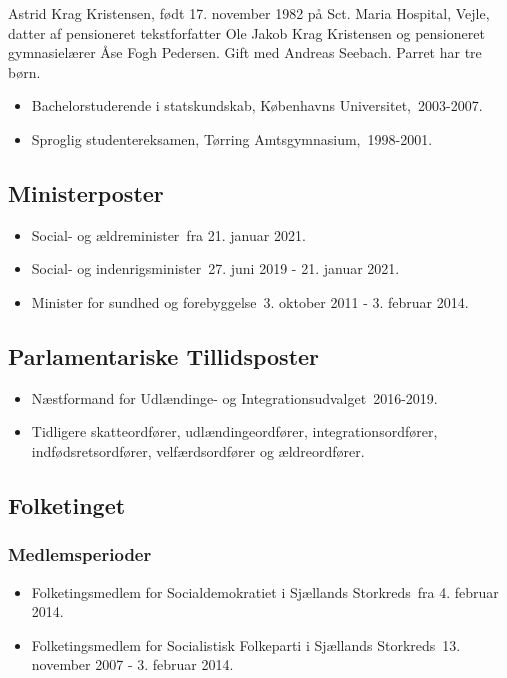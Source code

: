 \documentclass[11pt, a4paper]{awesome-cv}
\begin{document}
\makecvheader[R]
\makelettertitle
\begin{cvletter}
Astrid Krag Kristensen, født 17. november 1982 på Sct. Maria Hospital, Vejle, datter af pensioneret tekstforfatter Ole Jakob Krag Kristensen og pensioneret gymnasielærer Åse Fogh Pedersen. Gift med Andreas Seebach. Parret har tre børn.

\begin{itemize}
\item Bachelorstuderende i statskundskab, Københavns Universitet, 2003-2007.
\item Sproglig studentereksamen, Tørring Amtsgymnasium, 1998-2001.
\end{itemize}
\subsection*{Ministerposter}
\begin{itemize}
\item Social- og ældreminister fra 21. januar 2021.
\item Social- og indenrigsminister 27. juni 2019 - 21. januar 2021.
\item Minister for sundhed og forebyggelse 3. oktober 2011 - 3. februar 2014.
\end{itemize}
\subsection*{Parlamentariske Tillidsposter}
\begin{itemize}
\item Næstformand for Udlændinge- og Integrationsudvalget 2016-2019.
\item Tidligere skatteordfører, udlændingeordfører, integrationsordfører, indfødsretsordfører, velfærdsordfører og ældreordfører.
\end{itemize}
\subsection*{Folketinget}
\subsubsection*{Medlemsperioder}
\begin{itemize}
\item Folketingsmedlem for Socialdemokratiet i Sjællands Storkreds fra 4. februar 2014.
\item Folketingsmedlem for Socialistisk Folkeparti i Sjællands Storkreds 13. november 2007 - 3. februar 2014.
\end{itemize}

\end{cvletter}
\end{document}

